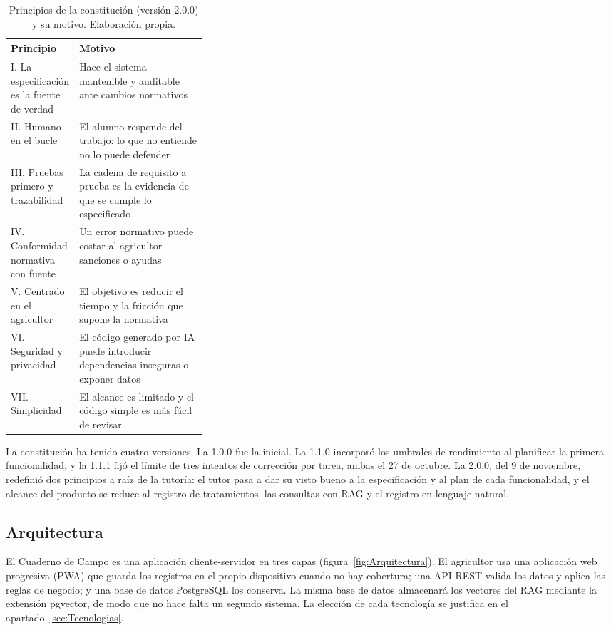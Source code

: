 \begin{table}[htbp]
	\centering
	\small
	\caption{Principios de la constitución (versión 2.0.0) y su motivo. Elaboración propia.}
	\label{tab:Constitucion}
	\begin{tabularx}{\linewidth}{@{}>{\raggedright\arraybackslash}p{0.32\linewidth}>{\raggedright\arraybackslash}X@{}}
		\toprule
		\textbf{Principio} & \textbf{Motivo} \\
		\midrule
		I. La especificación es la fuente de verdad & Hace el sistema mantenible y auditable ante cambios normativos \\
		II. Humano en el bucle & El alumno responde del trabajo: lo que no entiende no lo puede defender \\
		III. Pruebas primero y trazabilidad & La cadena de requisito a prueba es la evidencia de que se cumple lo especificado \\
		IV. Conformidad normativa con fuente & Un error normativo puede costar al agricultor sanciones o ayudas \\
		V. Centrado en el agricultor & El objetivo es reducir el tiempo y la fricción que supone la normativa \\
		VI. Seguridad y privacidad & El código generado por IA puede introducir dependencias inseguras o exponer datos \\
		VII. Simplicidad & El alcance es limitado y el código simple es más fácil de revisar \\
		\bottomrule
	\end{tabularx}
\end{table}

La constitución ha tenido cuatro versiones. La 1.0.0 fue la inicial. La 1.1.0 incorporó los umbrales de rendimiento al planificar la primera funcionalidad, y la 1.1.1 fijó el límite de tres intentos de corrección por tarea, ambas el 27 de octubre. La 2.0.0, del 9 de noviembre, redefinió dos principios a raíz de la tutoría: el tutor pasa a dar su visto bueno a la especificación y al plan de cada funcionalidad, y el alcance del producto se reduce al registro de tratamientos, las consultas con RAG y el registro en lenguaje natural.

\subsection{Arquitectura}\label{subsec:Arquitectura}

El Cuaderno de Campo es una aplicación cliente-servidor en tres capas (figura~\ref{fig:Arquitectura}). El agricultor usa una aplicación web progresiva (PWA) que guarda los registros en el propio dispositivo cuando no hay cobertura; una API REST valida los datos y aplica las reglas de negocio; y una base de datos PostgreSQL los conserva. La misma base de datos almacenará los vectores del RAG mediante la extensión pgvector, de modo que no hace falta un segundo sistema. La elección de cada tecnología se justifica en el apartado~\ref{sec:Tecnologias}.

